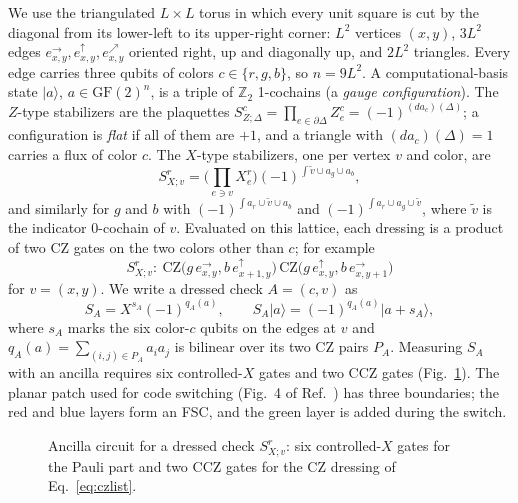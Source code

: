 \documentclass[a4paper]{article}
\newcommand{\rd}{r}
\newcommand{\gr}{g}
\newcommand{\bl}{b}
\newcommand{\GF}{\mathrm{GF}(2)}
\providecommand{\ket}[1]{\ensuremath{|#1\rangle}}
\newcommand{\eh}[1]{e^{\rightarrow}_{#1}}
\newcommand{\ev}[1]{e^{\uparrow}_{#1}}
\newcommand{\ed}[1]{e^{\nearrow}_{#1}}
\begin{document}
We use the triangulated $L\times L$ torus in which every unit square is cut by the diagonal from its lower-left to its upper-right corner: $L^2$ vertices $(x,y)$, $3L^2$ edges $\eh{x,y},\ev{x,y},\ed{x,y}$ oriented right, up and diagonally up, and $2L^2$ triangles. Every edge carries three qubits of colors $c\in\{\rd,\gr,\bl\}$, so $n=9L^2$. A computational-basis state $\ket{a}$, $a\in\GF^n$, is a triple of $\mathbb{Z}_2$ 1-cochains (a \emph{gauge configuration}). The $Z$-type stabilizers are the plaquettes $S^c_{Z;\Delta}=\prod_{e\in\partial\Delta}Z^c_e=(-1)^{(da_c)(\Delta)}$; a configuration is \emph{flat} if all of them are $+1$, and a triangle with $(da_c)(\Delta)=1$ carries a flux of color $c$. The $X$-type stabilizers, one per vertex $v$ and color, are~\cite{kobayashi2025clifford}
\begin{equation}
  S^{\rd}_{X;v}=\Big(\prod_{e\ni v}X^{\rd}_e\Big)(-1)^{\int\tilde v\cup a_\gr\cup a_\bl},
  \label{eq:xstab}
\end{equation}
and similarly for $\gr$ and $\bl$ with $(-1)^{\int a_\rd\cup\tilde v\cup a_\bl}$ and $(-1)^{\int a_\rd\cup a_\gr\cup\tilde v}$, where $\tilde v$ is the indicator 0-cochain of $v$. Evaluated on this lattice, each dressing is a product of two CZ gates on the two colors other than $c$; for example
\begin{equation}
  S^\rd_{X;v}:\ \mathrm{CZ}\big(\gr\,\eh{x,y},\bl\,\ev{x+1,y}\big)\,\mathrm{CZ}\big(\gr\,\ev{x,y},\bl\,\eh{x,y+1}\big)
  \label{eq:czlist}
\end{equation}
for $v=(x,y)$. We write a dressed check $A=(c,v)$ as
\begin{equation}
  S_A=X^{s_A}(-1)^{q_A(a)},\qquad S_A\ket{a}=(-1)^{q_A(a)}\ket{a+s_A},
  \label{eq:generic}
\end{equation}
where $s_A$ marks the six color-$c$ qubits on the edges at $v$ and $q_A(a)=\sum_{(i,j)\in P_A}a_ia_j$ is bilinear over its two CZ pairs $P_A$. Measuring $S_A$ with an ancilla requires six controlled-$X$ gates and two CCZ gates (Fig.~\ref{fig:xstab_circuit}). The planar patch used for code switching (Fig.~4 of Ref.~\cite{kobayashi2025clifford}) has three boundaries; the red and blue layers form an FSC, and the green layer is added during the switch.

\begin{figure}[t]
    \centering
    
    \caption{Ancilla circuit for a dressed check $S^{\rd}_{X;v}$: six controlled-$X$ gates for the Pauli part and two CCZ gates for the CZ dressing of Eq.~\eqref{eq:czlist}.}
    \label{fig:xstab_circuit}
\end{figure}
\end{document}
